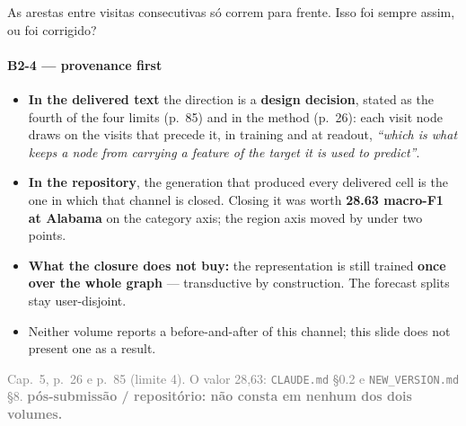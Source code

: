 \documentclass{beamer}
\begin{document}
\begin{frame}[noframenumbering]{As arestas entre visitas consecutivas só correm para frente. Isso foi sempre assim, ou foi corrigido?}
    \framesubtitle{B2-4 --- provenance first}
    \hypertarget{b24}{}
    \small\begin{itemize}\setlength{\itemsep}{0pt}\setlength{\parskip}{0pt}
        \item \textbf{In the delivered text} the direction is a \textbf{design decision}, stated as the fourth of the four limits (p.~85) and in the method (p.~26): each visit node draws on the visits that precede it, in training and at readout, \textit{``which is what keeps a node from carrying a feature of the target it is used to predict''}.
        \item \textbf{In the repository}, the generation that produced every delivered cell is the one in which that channel is closed. Closing it was worth \textbf{28.63 macro-F1 at Alabama} on the category axis; the region axis moved by under two points.
        \item \textbf{What the closure does not buy:} the representation is still trained \textbf{once over the whole graph} --- transductive by construction. The forecast splits stay user-disjoint.
        \item Neither volume reports a before-and-after of this channel; this slide does not present one as a result.
    \end{itemize}
    \vfill
    {\scriptsize
    \begin{minipage}[b]{0.775\linewidth}\raggedright\textcolor{gray}{Cap.~5, p.~26 e p.~85 (limite 4). O valor 28,63: \texttt{CLAUDE.md} §0.2 e \texttt{NEW\_VERSION.md} §8. \textbf{pós-submissão / repositório: não consta em nenhum dos dois volumes.}}\end{minipage}\hfill
    \begin{minipage}[b]{0.20\linewidth}\raggedleft \hyperlink{b0}{}\end{minipage}}
\end{frame}
\end{document}
